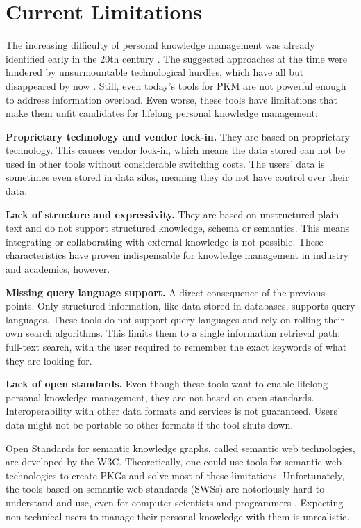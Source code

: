 \section{Current Limitations}
The increasing difficulty of personal knowledge management was already identified early in the 20th century \cite{Bush1945Memex, Engelbart1962AHI}. The suggested approaches at the time were hindered by unsurmountable technological hurdles, which have all but disappeared by now \cite{Davies2005Memex60}. Still, even today's tools for PKM are not powerful enough to address information overload. Even worse, these tools have limitations that make them unfit candidates for lifelong personal knowledge management:

    \textbf{Proprietary technology and vendor lock-in.} They are based on proprietary technology. This causes vendor lock-in, which means the data stored can not be used in other tools without considerable switching costs. The users' data is sometimes even stored in data silos, meaning they do not have control over their data.

    \textbf{Lack of structure and expressivity.} They are based on unstructured plain text and do not support structured knowledge, schema or semantics. This means integrating or collaborating with external knowledge is not possible. These characteristics have proven indispensable for knowledge management in industry and academics, however. 
    
    \textbf{Missing query language support.} A direct consequence of the previous points. Only structured information, like data stored in databases, supports query languages. These tools do not support query languages and rely on rolling their own search algorithms. This limits them to a single information retrieval path: full-text search, with the user required to remember the exact keywords of what they are looking for.
    
    \textbf{Lack of open standards.} Even though these tools want to enable lifelong personal knowledge management, they are not based on open standards. Interoperability with other data formats and services is not guaranteed. Users' data might not be portable to other formats if the tool shuts down.

Open Standards for semantic knowledge graphs, called semantic web technologies, are developed by the W3C. Theoretically, one could use tools for semantic web technologies to create PKGs and solve most of these limitations. Unfortunately, the tools based on semantic web standards (SWSs) are notoriously hard to understand and use, even for computer scientists and programmers \cite{EasierRDF}. Expecting non-technical users to manage their personal knowledge with them is unrealistic.


